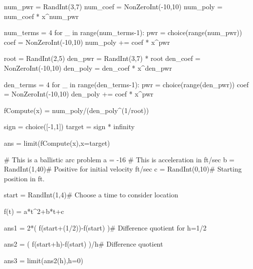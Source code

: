 
\begin{sagesilent}

num_pwr = RandInt(3,7)
num_coef = NonZeroInt(-10,10)
num_poly = num_coef * x^num_pwr

num_terms = 4
for _ in range(num_terms-1):
   pwr = choice(range(num_pwr))
   coef = NonZeroInt(-10,10)
   num_poly += coef * x^pwr


root = RandInt(2,5)
den_pwr = RandInt(3,7) * root
den_coef = NonZeroInt(-10,10)
den_poly = den_coef * x^den_pwr

den_terms = 4
for _ in range(den_terms-1):
   pwr = choice(range(den_pwr))
   coef = NonZeroInt(-10,10)
   den_poly += coef * x^pwr

fCompute(x) = num_poly/(den_poly^(1/root))

sign = choice([-1,1])
target = sign * infinity

ans = limit(fCompute(x),x=target)

\end{sagesilent}




\begin{sagesilent}
# This is a ballistic arc problem
a = -16 # This is acceleration in ft/sec
b = RandInt(1,40)# Positive for initial velocity ft/sec
c = RandInt(0,10)# Starting position in ft.

start = RandInt(1,4)# Choose a time to consider location

f(t) = a*t^2+b*t+c

ans1 = 2*( f(start+(1/2))-f(start) )# Difference quotient for h=1/2

ans2 = ( f(start+h)-f(start) )/h# Difference quotient

ans3 = limit(ans2(h),h=0)
\end{sagesilent}

